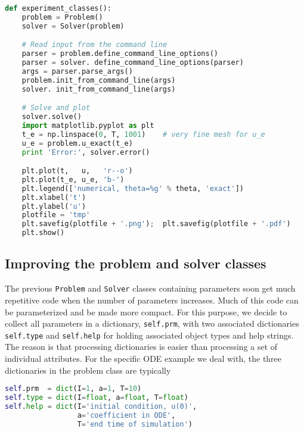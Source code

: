\documentclass[graybox,sectrefs,envcountresetchap,open=right,final]{svmonodo}
\begin{document}
\begin{lstlisting}[language=python,style=blue1_bluegreen]
def experiment_classes():
    problem = Problem()
    solver = Solver(problem)

    # Read input from the command line
    parser = problem.define_command_line_options()
    parser = solver. define_command_line_options(parser)
    args = parser.parse_args()
    problem.init_from_command_line(args)
    solver. init_from_command_line(args)

    # Solve and plot
    solver.solve()
    import matplotlib.pyplot as plt
    t_e = np.linspace(0, T, 1001)    # very fine mesh for u_e
    u_e = problem.u_exact(t_e)
    print 'Error:', solver.error()

    plt.plot(t,   u,   'r--o')
    plt.plot(t_e, u_e, 'b-')
    plt.legend(['numerical, theta=%g' % theta, 'exact'])
    plt.xlabel('t')
    plt.ylabel('u')
    plotfile = 'tmp'
    plt.savefig(plotfile + '.png');  plt.savefig(plotfile + '.pdf')
    plt.show()

\end{lstlisting}


\subsection{Improving the problem and solver classes}
\label{softeng1:prog:se:class2}

The previous \texttt{Problem} and \texttt{Solver} classes containing parameters
soon get much repetitive code when the number of parameters increases.
Much of this code can be parameterized and be made more compact.
For this purpose, we decide to collect all parameters in a dictionary,
\texttt{self.prm}, with two associated dictionaries \texttt{self.type} and
\texttt{self.help} for holding associated object types and help strings.
The reason is that processing dictionaries is easier than processing
a set of individual attributes.
For the specific ODE example we deal with, the three dictionaries in
the problem class are typically







\begin{lstlisting}[language=python,style=blue1_bluegreen]
self.prm  = dict(I=1, a=1, T=10)
self.type = dict(I=float, a=float, T=float)
self.help = dict(I='initial condition, u(0)',
                 a='coefficient in ODE',
                 T='end time of simulation')

\end{lstlisting}
\end{document}
